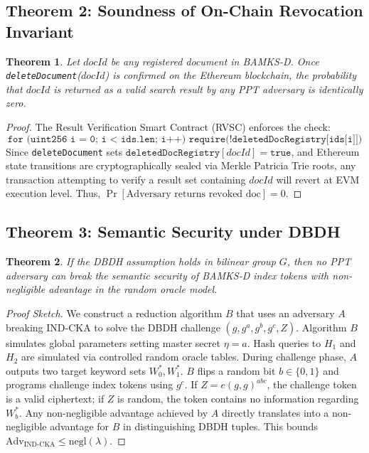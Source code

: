 \documentclass[journal,10pt,twocolumn]{IEEEtran}
\newtheorem{theorem}{Theorem}
\begin{document}
\subsection{Theorem 2: Soundness of On-Chain Revocation Invariant}
\begin{theorem}
Let $docId$ be any registered document in BAMKS-D. Once \texttt{deleteDocument}($docId$) is confirmed on the Ethereum blockchain, the probability that $docId$ is returned as a valid search result by any PPT adversary is identically zero.
\end{theorem}
\begin{proof}
The Result Verification Smart Contract (RVSC) enforces the check:
\begin{equation}
\texttt{for (uint256 i = 0; i < ids.len; i++) require(!deletedDocRegistry[ids[i]])}
\end{equation}
Since \texttt{deleteDocument} sets $\texttt{deletedDocRegistry}[docId] = \texttt{true}$, and Ethereum state transitions are cryptographically sealed via Merkle Patricia Trie roots, any transaction attempting to verify a result set containing $docId$ will revert at EVM execution level. Thus, $\Pr[\text{Adversary returns revoked doc}] = 0$.
\end{proof}

\subsection{Theorem 3: Semantic Security under DBDH}
\begin{theorem}
If the DBDH assumption holds in bilinear group $G$, then no PPT adversary can break the semantic security of BAMKS-D index tokens with non-negligible advantage in the random oracle model.
\end{theorem}
\begin{proof}[Proof Sketch]
We construct a reduction algorithm $B$ that uses an adversary $A$ breaking IND-CKA to solve the DBDH challenge $(g, g^a, g^b, g^c, Z)$. Algorithm $B$ simulates global parameters setting master secret $\eta = a$. Hash queries to $H_1$ and $H_2$ are simulated via controlled random oracle tables. During challenge phase, $A$ outputs two target keyword sets $W_0^*, W_1^*$. $B$ flips a random bit $b \in \{0, 1\}$ and programs challenge index tokens using $g^c$. If $Z = e(g, g)^{abc}$, the challenge token is a valid ciphertext; if $Z$ is random, the token contains no information regarding $W_b^*$. Any non-negligible advantage achieved by $A$ directly translates into a non-negligible advantage for $B$ in distinguishing DBDH tuples. This bounds $\text{Adv}_{\text{IND-CKA}} \le \text{negl}(\lambda)$.
\end{proof}
\end{document}
